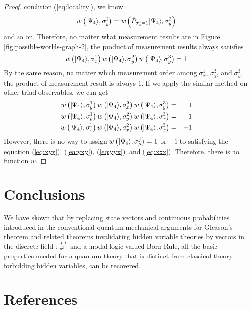 \documentclass[english,12pt]{iopart}
\newcommand{\ffzd}[1]{{\mathbb{F}^{d\;*}_{#1}}}
\newcommand{\andy}[1]{\fbox{\begin{minipage}{0.9\textwidth}\color{blue}{Andy says: #1}\end{minipage}}}
\begin{document}
\begin{proof}
condition (\ref{eq:locality}), we know 
\[
w\left({\left\vert{\Psi_{4}}\right\rangle},\sigma_{y}^{2}\right)=w\left(\hat{P}_{\sigma_{x}^{1}=1}{\left\vert{\Psi_{4}}\right\rangle},\sigma_{y}^{2}\right)
\]
and so on. Therefore, no matter what measurement results are in Figure
\ref{fig:possible-worlds-graph-2}, the product of measurement results
always satisfies 
\begin{equation}
w\left({\left\vert{\Psi_{4}}\right\rangle},\sigma_{x}^{1}\right)w\left({\left\vert{\Psi_{4}}\right\rangle},\sigma_{y}^{2}\right)w\left({\left\vert{\Psi_{4}}\right\rangle},\sigma_{y}^{3}\right)=1\label{eq:xyy}
\end{equation}
By the same reason, no matter which measurement order among $\sigma_{x}^{1}$,
$\sigma_{y}^{2}$, and $\sigma_{y}^{3}$, the product of measurement
result is always $1$. If we apply the similar method on other triad
observables, we can get 
\begin{eqnarray}
w\left({\left\vert{\Psi_{4}}\right\rangle},\sigma_{y}^{1}\right)w\left({\left\vert{\Psi_{4}}\right\rangle},\sigma_{x}^{2}\right)w\left({\left\vert{\Psi_{4}}\right\rangle},\sigma_{y}^{3}\right) & = & 1\label{eq:yxy}\\
w\left({\left\vert{\Psi_{4}}\right\rangle},\sigma_{y}^{1}\right)w\left({\left\vert{\Psi_{4}}\right\rangle},\sigma_{y}^{2}\right)w\left({\left\vert{\Psi_{4}}\right\rangle},\sigma_{x}^{3}\right) & = & 1\label{eq:yyx}\\
w\left({\left\vert{\Psi_{4}}\right\rangle},\sigma_{x}^{1}\right)w\left({\left\vert{\Psi_{4}}\right\rangle},\sigma_{x}^{2}\right)w\left({\left\vert{\Psi_{4}}\right\rangle},\sigma_{x}^{3}\right) & = & -1\label{eq:xxx}
\end{eqnarray}
However, there is no way to assign $w\left({\left\vert{\Psi_{4}}\right\rangle},\sigma_{\mu}^{j}\right)=1$
or $-1$ to satisfying the equation (\ref{eq:xyy}), (\ref{eq:yxy}),
(\ref{eq:yyx}), and (\ref{eq:xxx}). Therefore, there is no function
$w$.\end{proof}%

\section{Conclusions}

We have shown that by replacing state vectors and continuous probabilities
introduced in the conventional quantum mechanical arguments for
Gleason's theorem and related theorems invalidating hidden variable
theories by vectors in the discrete field $\ffzd{p^{2}}$ and a modal
logic-valued Born Rule, all the basic properties needed for a quantum
theory that is distinct from classical theory, forbidding hidden
variables, can be recovered.

\andy{Need to close with an assessment of the Mayer-Mermin discussion
  about the validity of the KS theorem in a world with finite
  resources and precision.}

\section*{References}



\end{document}
